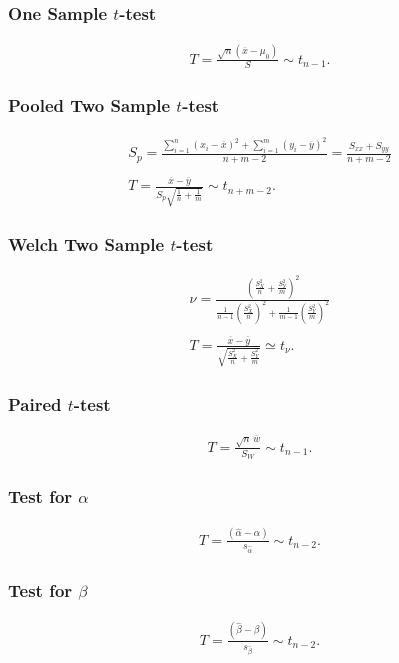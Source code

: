 \documentclass[a4paper, 12pt, twoside]{article}
\begin{document}
\subsubsection{One Sample $t$-test}
\begin{gather*}
    T = \frac{\sqrt{n}(\overline{x} - \mu_0)}{S} \sim t_{n-1}.
\end{gather*}

\subsubsection{Pooled Two Sample $t$-test}
\begin{gather*}
    S_p = \frac{\sum_{i = 1}^n (x_i - \overline{x})^2
        + \sum_{i = 1}^m (y_i - \overline{y})^2}{n + m - 2}
    = \frac{S_{xx} + S_{yy}}{n + m - 2} \\ \\
    T = \frac{\overline{x} - \overline{y}}
    {S_p\sqrt{\frac{1}{n} + \frac{1}{m}}} \sim t_{n + m - 2}.
\end{gather*}

\subsubsection{Welch Two Sample $t$-test}
\begin{gather*}
    \nu = \frac{(\frac{S_X^2}{n} + \frac{S_Y^2}{m})^2}
    {\frac{1}{n - 1}(\frac{S_X^2}{n})^2
        + \frac{1}{m - 1}(\frac{S_Y^2}{m})^2} \\ \\
    T = \frac{\overline{x} - \overline{y}}
    {\sqrt{\frac{S_X^2}{n} + \frac{S_Y^2}{m}}} \simeq t_\nu.
\end{gather*}

\subsubsection{Paired $t$-test}
\begin{gather*}
    T = \frac{\sqrt{n} \, \overline{w}}{S_W} \sim t_{n - 1}.
\end{gather*}

\subsubsection{Test for $\alpha$}
\begin{gather*}
    T = \frac{(\hat\alpha - \alpha)}{s_{\hat\alpha}}
    \sim t_{n - 2}.
\end{gather*}

\subsubsection{Test for $\beta$}
\begin{gather*}
    T = \frac{(\hat\beta - \beta)}{s_{\hat\beta}}
    \sim t_{n - 2}.
\end{gather*}
\end{document}
